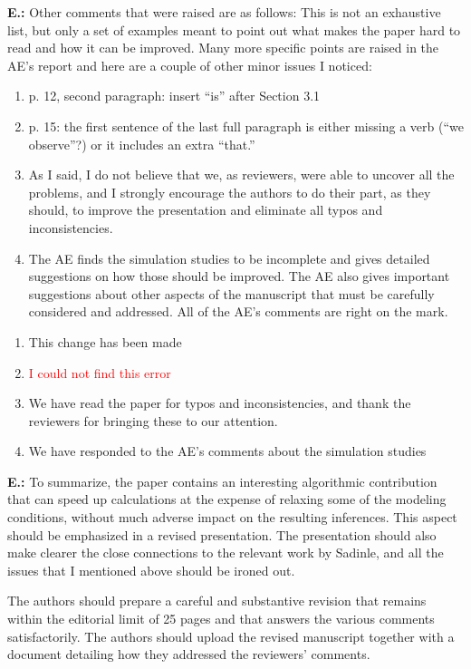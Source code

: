 \documentclass[letterpaper, parskip]{scrartcl}
\newcommand{\pointRaised}[2]{%
	\textbf{#1.\theresponsectr:} #2
}
\newcounter{responsectr}[section]     %
\newcommand{\reply}[1]{%
	\refstepcounter{responsectr}%
		\begin{tcolorbox}
			\itshape #1
		\end{tcolorbox}
}
\begin{document}
\pointRaised{E}{%
	Other comments that were raised are as follows: This is not an exhaustive list, but only a set of examples meant to point out what makes the paper hard to read and how it can be improved.  Many more specific points are raised in the AE’s report and here are a couple of other minor issues I noticed:
	\begin{enumerate}
	\item p. 12, second paragraph:  insert “is” after Section 3.1

	\item p. 15:  the first sentence of the last full paragraph is either missing a verb (“we observe”?) or it includes an extra “that.”

	\item As I said, I do not believe that we, as reviewers, were able to uncover all the problems, and I strongly encourage the authors to do their part, as they should, to improve the presentation and eliminate all typos and inconsistencies.

	\item The AE finds the simulation studies to be incomplete and gives detailed suggestions on how those should be improved.  The AE also gives important suggestions about other aspects of the manuscript that must be carefully considered and addressed.  All of the AE’s comments are right on the mark.

	\end{enumerate}
	}

	\reply{%
	\begin{enumerate}
		\item This change has been made
		
		\item \textcolor{red}{I could not find this error}
		
		\item We have read the paper for typos and inconsistencies, and thank the reviewers for bringing these to our attention. 
		
		\item We have responded to the AE's comments about the simulation studies
	\end{enumerate}
}

\pointRaised{E}{To summarize, the paper contains an interesting algorithmic contribution that can speed up calculations at the expense of relaxing some of the modeling conditions, without much adverse impact on the resulting inferences.  This aspect should be emphasized in a revised presentation.  The presentation should also make clearer the close connections to the relevant work by Sadinle, and all the issues that I mentioned above should be ironed out.
	
The authors should prepare a careful and substantive revision that remains within the editorial limit of 25 pages and that answers the various comments satisfactorily.  The authors should upload the revised manuscript together with a document detailing how they addressed the reviewers’ comments.}
\end{document}
